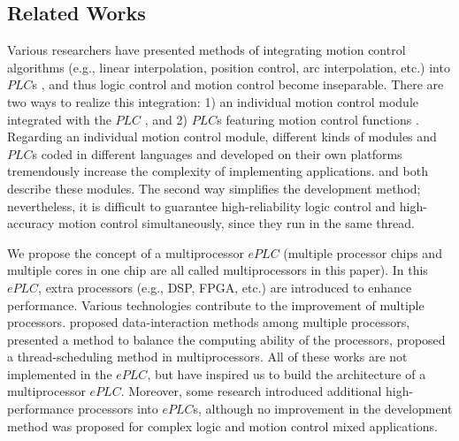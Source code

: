 \documentclass[journal,UTF8]{IEEEtran}
\begin{document}
\subsection{Related Works}
Various researchers have presented methods of integrating motion control algorithms (e.g., linear interpolation, position control, arc interpolation, etc.) into $PLC$s \cite{Ioannides2004Design,Shi2016The,Fang2017Design},  and thus logic control and motion control become inseparable. There are two ways to realize this integration: 1) an individual motion control module integrated with the $PLC$ \cite{Peng2011Linear}, and 2) $PLC$s featuring motion control functions \cite{Ioannides2004Design,syaichu2011model}. Regarding an individual motion control module, different kinds of modules and $PLC$s coded in different languages and developed on their own platforms tremendously increase the complexity of implementing applications. \cite{Peng2011Linear,Qian2014A}  and \cite{Panasonic2011Programmable} both describe these modules. The second way simplifies the development method; nevertheless, it is difficult to guarantee high-reliability logic control and high-accuracy motion control simultaneously, since they run in the same thread. 

We propose the concept of a multiprocessor $ePLC$ (multiple processor chips and multiple cores in one chip are all called multiprocessors in this paper). In this $ePLC$, extra processors (e.g., DSP, FPGA, etc.) are introduced to enhance performance. Various technologies contribute to the improvement of multiple processors. \cite{Dubois2002Memory,Patel2006Processor} proposed data-interaction methods among multiple processors, \cite{Zhu2016Providing} presented a method to balance the computing ability of the processors, \cite{Albarakat2017MTB} proposed a thread-scheduling method in multiprocessors. All of these works are not implemented in the $ePLC$, but have inspired us to build the architecture of a multiprocessor $ePLC$. Moreover, some research \cite{Hajduk2015Architecture, Chmiel2016An} introduced additional high-performance processors into $ePLC$s, although no improvement in the development method was proposed for complex logic and motion control mixed applications.
\end{document}
